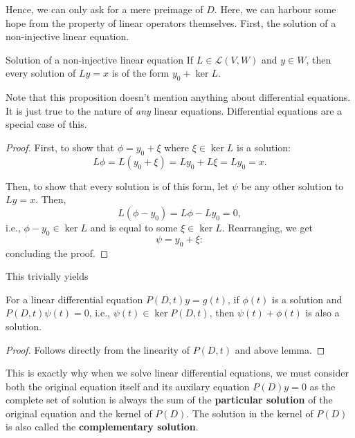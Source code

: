 Hence, we can only ask for a mere preimage of \(D\). Here, we can harbour some hope from
the property of linear operators themselves. First, the solution of a non-injective linear equation.

\begin{lemma}{Solution of a non-injective linear equation}{}
  If \(L \in \mathcal{L}(V, W)\) and \(y \in W\), then every solution of \(Ly = x\) is
  of the form \(y_0 + \ker L\).
\end{lemma}

Note that this proposition doesn't mention anything about differential equations. It is just true
to the nature of \emph{any} linear equations. Differential equations are a special case of this.

\begin{proof}
  First, to show that \(\phi = y_0 + \xi\) where \(\xi \in \ker L\) is a solution:
  \begin{equation}
    L\phi = L(y_0 + \xi) = Ly_0 + L\xi = Ly_0 = x.
  \end{equation}

  Then, to show that every solution is of this form, let \(\psi\) be any other solution
  to \(Ly = x\). Then,
  \begin{equation}
    L(\phi - y_0) = L\phi - Ly_0 = 0,
  \end{equation}
  i.e., \(\phi - y_0 \in \ker L\) and is equal to some \(\xi \in \ker L\). Rearranging, we get
  \begin{equation}
    \psi = y_0 + \xi:
  \end{equation}
  concluding the proof.
\end{proof}

This trivially yields

\begin{prop}{}{}
  For a linear differential equation \(P(D, t)y = g(t)\), if \(\phi(t)\) is a solution
  and \(P(D, t) \psi(t) = 0\), i.e., \(\psi(t) \in \ker P(D, t)\), then \(\psi(t) + \phi(t)\)
  is also a solution.
\end{prop}

\begin{proof}
  Follows directly from the linearity of \(P(D, t)\) and above lemma.
\end{proof}

This is exactly why when we solve linear differential equations, we must consider both
the original equation itself and its auxilary equation \(P(D)y = 0\) as the complete set of solution
is always the sum of the \textbf{particular solution} of the original equation and the kernel of
\(P(D)\). The solution in the kernel of \(P(D)\) is also called the \textbf{complementary solution}.

